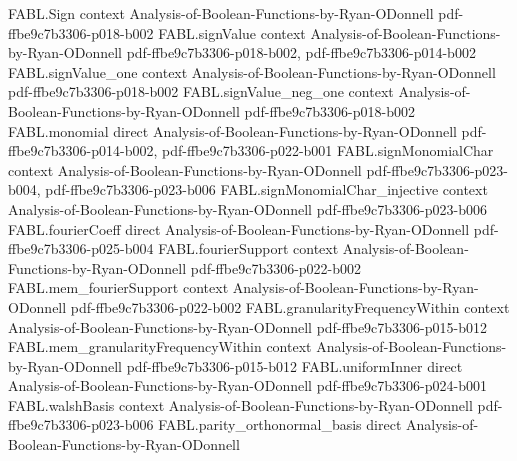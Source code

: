 \begin{theorem}
\label{FABL.discreteDerivative_majority_odd_eq_middleLayerIndicator_init}
\leanok
{}
\proofstep
  {FABL.Sign}
  {context}
  {Analysis-of-Boolean-Functions-by-Ryan-ODonnell}
  {pdf-ffbe9c7b3306-p018-b002}
\proofstep
  {FABL.signValue}
  {context}
  {Analysis-of-Boolean-Functions-by-Ryan-ODonnell}
  {pdf-ffbe9c7b3306-p018-b002,
    pdf-ffbe9c7b3306-p014-b002}
\proofstep
  {FABL.signValue_one}
  {context}
  {Analysis-of-Boolean-Functions-by-Ryan-ODonnell}
  {pdf-ffbe9c7b3306-p018-b002}
\proofstep
  {FABL.signValue_neg_one}
  {context}
  {Analysis-of-Boolean-Functions-by-Ryan-ODonnell}
  {pdf-ffbe9c7b3306-p018-b002}
\proofstep
  {FABL.monomial}
  {direct}
  {Analysis-of-Boolean-Functions-by-Ryan-ODonnell}
  {pdf-ffbe9c7b3306-p014-b002,
    pdf-ffbe9c7b3306-p022-b001}
\proofstep
  {FABL.signMonomialChar}
  {context}
  {Analysis-of-Boolean-Functions-by-Ryan-ODonnell}
  {pdf-ffbe9c7b3306-p023-b004,
    pdf-ffbe9c7b3306-p023-b006}
\proofstep
  {FABL.signMonomialChar_injective}
  {context}
  {Analysis-of-Boolean-Functions-by-Ryan-ODonnell}
  {pdf-ffbe9c7b3306-p023-b006}
\proofstep
  {FABL.fourierCoeff}
  {direct}
  {Analysis-of-Boolean-Functions-by-Ryan-ODonnell}
  {pdf-ffbe9c7b3306-p025-b004}
\proofstep
  {FABL.fourierSupport}
  {context}
  {Analysis-of-Boolean-Functions-by-Ryan-ODonnell}
  {pdf-ffbe9c7b3306-p022-b002}
\proofstep
  {FABL.mem_fourierSupport}
  {context}
  {Analysis-of-Boolean-Functions-by-Ryan-ODonnell}
  {pdf-ffbe9c7b3306-p022-b002}
\proofstep
  {FABL.granularityFrequencyWithin}
  {context}
  {Analysis-of-Boolean-Functions-by-Ryan-ODonnell}
  {pdf-ffbe9c7b3306-p015-b012}
\proofstep
  {FABL.mem_granularityFrequencyWithin}
  {context}
  {Analysis-of-Boolean-Functions-by-Ryan-ODonnell}
  {pdf-ffbe9c7b3306-p015-b012}
\proofstep
  {FABL.uniformInner}
  {direct}
  {Analysis-of-Boolean-Functions-by-Ryan-ODonnell}
  {pdf-ffbe9c7b3306-p024-b001}
\proofstep
  {FABL.walshBasis}
  {context}
  {Analysis-of-Boolean-Functions-by-Ryan-ODonnell}
  {pdf-ffbe9c7b3306-p023-b006}
\proofstep
  {FABL.parity_orthonormal_basis}
  {direct}
  {Analysis-of-Boolean-Functions-by-Ryan-ODonnell}

\end{theorem}
